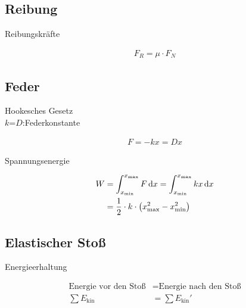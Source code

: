 \subsection{Reibung}

\begin{boxleft}Reibungskräfte
\end{boxleft}\begin{boxrightshaded}
\begin{align}
F_R=\mu\cdot F_N
\end{align}
\end{boxrightshaded}

\subsection{Feder}


\begin{boxleft}Hookesches Gesetz\\
$k$=$D$:Federkonstante
\end{boxleft}\begin{boxrightshaded}
\begin{align}
F=-kx=Dx
\end{align}
\end{boxrightshaded}

\begin{boxleft}Spannungsenergie
\end{boxleft}\begin{boxrightshaded}
\begin{align}
W	&=\int_{x_\text{min}}^{x_\text{max}}F\mathop{}\!\mathrm{d} x=\int_{x_\text{min}}^{x_\text{max}}kx\mathop{}\!\mathrm{d} x\\
	&=\frac{1}{2}\cdot k\cdot \left(x_{\text{max}}^2-x_{\text{min}}^2\right)
\end{align}
\end{boxrightshaded}

\subsection{Elastischer Stoß}

\begin{boxleft}Energieerhaltung
\end{boxleft}\begin{boxrightshaded}
\begin{align}
\text{Energie vor den Stoß} &= \text{Energie nach den Stoß}\nonumber\\
\sum E_{\text{kin}}&=\sum E_{\text{kin}}'
\end{align}
\end{boxrightshaded}


